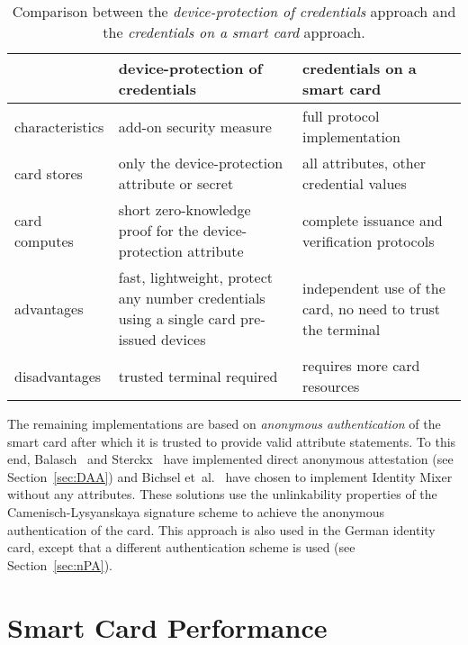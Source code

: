\begin{table}
  \centering
  \caption{Comparison between the \emph{device-protection of credentials}
    approach and the \emph{credentials on a smart card} approach.}
  \label{tbl:approaches}
  \renewcommand{\tabcolsep}{1.25mm}
  \renewcommand{\arraystretch}{1.25}
  \begin{tabular}{l|p{47mm}|p{47mm}|}
     & device-protection of credentials & credentials on a smart card \\\hline
    characteristics &
      add-on security measure &
      full protocol implementation \\\hline
    card stores &
      only the device-protection attribute or secret &
      all attributes, other credential values \\\hline
    card computes &
      short zero-knowledge proof for the device-protection attribute &
      complete issuance and verification protocols \\\hline
    advantages &
      fast, lightweight, protect any number credentials
        using a single card pre-issued devices &
      independent use of the card, no need to trust the terminal \\\hline
    disadvantages &
      trusted terminal required &
      requires more card resources \\\hline
  \end{tabular}
\end{table}

The remaining implementations are based on \emph{anonymous authentication} of
the smart card after which it is trusted to provide valid attribute statements.
To this end, Balasch~\cite{Balasch2008} and Sterckx~\cite{Sterckx09} have
implemented direct anonymous attestation (see Section~\ref{sec:DAA}) and
Bichsel et~al.~\cite{BichselCGS2009} have chosen to implement Identity Mixer
without any attributes. These solutions use the unlinkability properties of the
Camenisch-Lysyanskaya signature scheme to achieve the anonymous authentication
of the card. This approach is also used in the German identity card, except that
a different authentication scheme is used (see Section~\ref{sec:nPA}).

\section{Smart Card Performance\label{sec:perf-comparison}}

